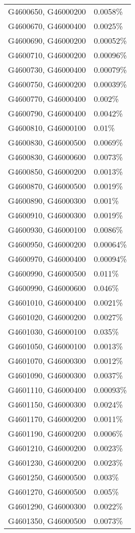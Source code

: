 \begin{longtable}[]{@{}ll@{}}
G4600650, G46000200 & 0.0058\% \\
G4600670, G46000400 & 0.0025\% \\
G4600690, G46000200 & 0.00052\% \\
G4600710, G46000200 & 0.00096\% \\
G4600730, G46000400 & 0.00079\% \\
G4600750, G46000200 & 0.00039\% \\
G4600770, G46000400 & 0.002\% \\
G4600790, G46000400 & 0.0042\% \\
G4600810, G46000100 & 0.01\% \\
G4600830, G46000500 & 0.0069\% \\
G4600830, G46000600 & 0.0073\% \\
G4600850, G46000200 & 0.0013\% \\
G4600870, G46000500 & 0.0019\% \\
G4600890, G46000300 & 0.001\% \\
G4600910, G46000300 & 0.0019\% \\
G4600930, G46000100 & 0.0086\% \\
G4600950, G46000200 & 0.00064\% \\
G4600970, G46000400 & 0.00094\% \\
G4600990, G46000500 & 0.011\% \\
G4600990, G46000600 & 0.046\% \\
G4601010, G46000400 & 0.0021\% \\
G4601020, G46000200 & 0.0027\% \\
G4601030, G46000100 & 0.035\% \\
G4601050, G46000100 & 0.0013\% \\
G4601070, G46000300 & 0.0012\% \\
G4601090, G46000300 & 0.0037\% \\
G4601110, G46000400 & 0.00093\% \\
G4601150, G46000300 & 0.0024\% \\
G4601170, G46000200 & 0.0011\% \\
G4601190, G46000200 & 0.0006\% \\
G4601210, G46000200 & 0.0023\% \\
G4601230, G46000200 & 0.0023\% \\
G4601250, G46000500 & 0.003\% \\
G4601270, G46000500 & 0.005\% \\
G4601290, G46000300 & 0.0022\% \\
G4601350, G46000500 & 0.0073\% \\

\end{longtable}
